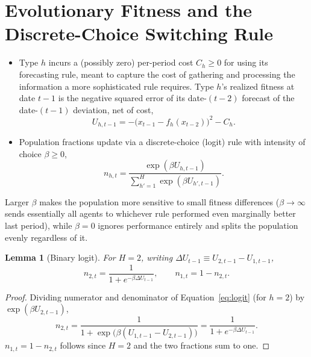 \documentclass[11pt]{article}
\newtheorem{lemma}{Lemma}
\theoremstyle{remark}
\theoremstyle{definition}
\begin{document}
\section{Evolutionary Fitness and the Discrete-Choice Switching Rule}
\label{sec:switching}

\begin{itemize}
\item[(A7)] Type $h$ incurs a (possibly zero) per-period cost $C_h\ge0$ for using its forecasting rule, meant to capture the cost of gathering and processing the information a more sophisticated rule requires. Type $h$'s realized fitness at date $t-1$ is the negative squared error of its date-$(t-2)$ forecast of the date-$(t-1)$ deviation, net of cost,
\begin{equation}
U_{h,t-1} = -\big(x_{t-1}-f_h(x_{t-2})\big)^2 - C_h.
\label{eq:fitness}
\end{equation}
\item[(A8)] Population fractions update via a discrete-choice (logit) rule with intensity of choice $\beta\ge0$,
\begin{equation}
n_{h,t} = \frac{\exp(\beta U_{h,t-1})}{\sum_{h'=1}^{H}\exp(\beta U_{h',t-1})}.
\label{eq:logit}
\end{equation}
\end{itemize}

Larger $\beta$ makes the population more sensitive to small fitness differences ($\beta\to\infty$ sends essentially all agents to whichever rule performed even marginally better last period), while $\beta=0$ ignores performance entirely and splits the population evenly regardless of it.

\begin{lemma}[Binary logit]
\label{lem:logit}
For $H=2$, writing $\Delta U_{t-1}\equiv U_{2,t-1}-U_{1,t-1}$,
\begin{equation}
n_{2,t} = \frac{1}{1+e^{-\beta \Delta U_{t-1}}}, \qquad n_{1,t}=1-n_{2,t}.
\label{eq:binarylogit}
\end{equation}
\end{lemma}
\begin{proof}
Dividing numerator and denominator of Equation~\eqref{eq:logit} (for $h=2$) by $\exp(\beta U_{2,t-1})$,
\begin{equation*}
n_{2,t} = \frac{1}{1+\exp\!\big(\beta(U_{1,t-1}-U_{2,t-1})\big)} = \frac{1}{1+e^{-\beta\Delta U_{t-1}}}.
\end{equation*}
$n_{1,t}=1-n_{2,t}$ follows since $H=2$ and the two fractions sum to one.
\end{proof}
\end{document}
